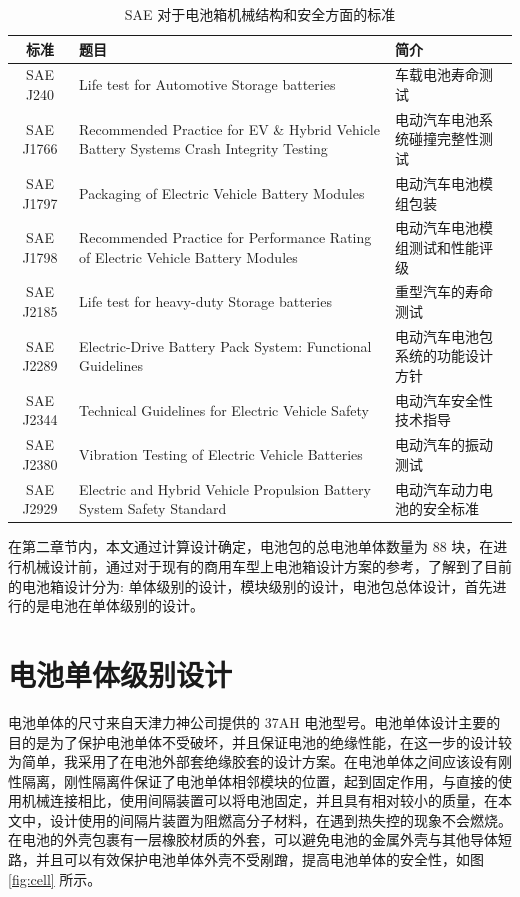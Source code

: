 \begin{table}
	\centering
	\caption{SAE 对于电池箱机械结构和安全方面的标准} \label{tab:SAE_standard}
	\begin{tabular*}{0.9\textwidth}{@{\extracolsep{\fill}}cp{5cm}p{5cm}}
		\toprule
		\textbf{标准} & \textbf{题目} & \textbf{简介} \\
		\midrule
		SAE J240 & Life test for Automotive Storage batteries & 车载电池寿命测试 \\
        SAE J1766 & Recommended Practice for EV \& Hybrid Vehicle Battery Systems Crash Integrity Testing & 电动汽车电池系统碰撞完整性测试\\
        SAE J1797 & Packaging of Electric Vehicle Battery Modules & 电动汽车电池模组包装\\
        SAE J1798 & Recommended Practice for Performance Rating of Electric Vehicle Battery Modules & 电动汽车电池模组测试和性能评级 \\
        SAE J2185 & Life test for heavy-duty Storage batteries & 重型汽车的寿命测试\\
        SAE J2289 & Electric-Drive Battery Pack System: Functional Guidelines & 电动汽车电池包系统的功能设计方针\\
        SAE J2344 & Technical Guidelines for Electric Vehicle Safety & 电动汽车安全性技术指导\\
        SAE J2380 & Vibration Testing of Electric Vehicle Batteries & 电动汽车的振动测试\\
        SAE J2929 & Electric and Hybrid Vehicle Propulsion Battery System Safety Standard & 电动汽车动力电池的安全标准\\
		\bottomrule
	\end{tabular*}
\end{table}


在第二章节内，本文通过计算设计确定，电池包的总电池单体数量为 88 块，在进行机械设计前，通过对于现有的商用车型上电池箱设计方案的参考，了解到了目前的电池箱设计分为: 单体级别的设计，模块级别的设计，电池包总体设计，首先进行的是电池在单体级别的设计。

\section{电池单体级别设计}
电池单体的尺寸来自天津力神公司提供的 37AH 电池型号。电池单体设计主要的目的是为了保护电池单体不受破坏，并且保证电池的绝缘性能，在这一步的设计较为简单，我采用了在电池外部套绝缘胶套的设计方案。在电池单体之间应该设有刚性隔离，刚性隔离件保证了电池单体相邻模块的位置，起到固定作用，与直接的使用机械连接相比，使用间隔装置可以将电池固定，并且具有相对较小的质量，在本文中，设计使用的间隔片装置为阻燃高分子材料，在遇到热失控的现象不会燃烧。在电池的外壳包裹有一层橡胶材质的外套，可以避免电池的金属外壳与其他导体短路，并且可以有效保护电池单体外壳不受剐蹭，提高电池单体的安全性，如图 \ref{fig:cell} 所示。

